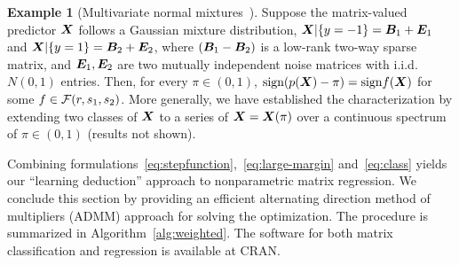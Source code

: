 \documentclass[11pt]{article}
\theoremstyle{definition}
\newtheorem{example}{Example}
\def\sign{\textup{sign}}
\begin{document}
\begin{example}[Multivariate normal mixtures~\citep{hu2020matrix}] Suppose the matrix-valued predictor $\bm X$ follows a Gaussian mixture distribution, $\bm X|\{y=-1\}=\bm B_1+\bm{E}_1$ and $ \bm X|\{y=1\}=\bm B_2+\bm{E}_2$, where $(\bm B_1-\bm B_2)$ is a low-rank two-way sparse matrix, and $\bm{E}_1, \bm{E}_2$ are two mutually independent noise matrices with i.i.d.\ $N(0,1)$ entries. Then, for every $\pi\in(0,1)$, $\sign(p(\mX)-\pi)= \sign f(\mX)$ for some $f\in \mathcal{F}(r,s_1,s_2)$. More generally, we have established the characterization by extending two classes of $\bm X$ to a series of $\bm X=\bm X(\pi)$ over a continuous spectrum of $\pi \in (0,1)$ (results not shown). 

\end{example}

Combining formulations~\eqref{eq:stepfunction},~\eqref{eq:large-margin} and~\eqref{eq:class} yields our ``learning deduction'' approach to nonparametric matrix regression.
 We conclude this section by providing an efficient alternating direction method of multipliers (ADMM) approach for solving the optimization. The procedure is summarized in Algorithm~\ref{alg:weighted}. The software for both matrix classification and regression is available at CRAN.
 
\end{document}

